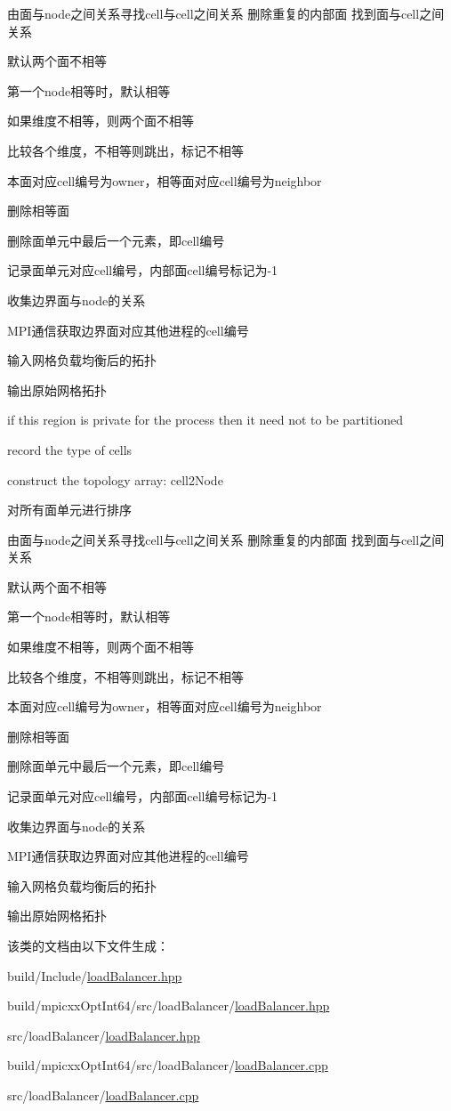 由面与node之间关系寻找cell与cell之间关系 删除重复的内部面 找到面与cell之间关系

默认两个面不相等

第一个node相等时，默认相等

如果维度不相等，则两个面不相等

比较各个维度，不相等则跳出，标记不相等

本面对应cell编号为owner，相等面对应cell编号为neighbor

删除相等面

删除面单元中最后一个元素，即cell编号

记录面单元对应cell编号，内部面cell编号标记为-\/1

收集边界面与node的关系

MPI通信获取边界面对应其他进程的cell编号

输入网格负载均衡后的拓扑

输出原始网格拓扑

if this region is private for the process then it need not to be partitioned

record the type of cells

construct the topology array: cell2Node

对所有面单元进行排序

由面与node之间关系寻找cell与cell之间关系 删除重复的内部面 找到面与cell之间关系

默认两个面不相等

第一个node相等时，默认相等

如果维度不相等，则两个面不相等

比较各个维度，不相等则跳出，标记不相等

本面对应cell编号为owner，相等面对应cell编号为neighbor

删除相等面

删除面单元中最后一个元素，即cell编号

记录面单元对应cell编号，内部面cell编号标记为-\/1

收集边界面与node的关系

MPI通信获取边界面对应其他进程的cell编号

输入网格负载均衡后的拓扑

输出原始网格拓扑 

该类的文档由以下文件生成：\begin{DoxyCompactItemize}
\item 
build/Include/\hyperlink{build_2Include_2loadBalancer_8hpp}{loadBalancer.hpp}\item 
build/mpicxxOptInt64/src/loadBalancer/\hyperlink{build_2mpicxxOptInt64_2src_2loadBalancer_2loadBalancer_8hpp}{loadBalancer.hpp}\item 
src/loadBalancer/\hyperlink{src_2loadBalancer_2loadBalancer_8hpp}{loadBalancer.hpp}\item 
build/mpicxxOptInt64/src/loadBalancer/\hyperlink{build_2mpicxxOptInt64_2src_2loadBalancer_2loadBalancer_8cpp}{loadBalancer.cpp}\item 
src/loadBalancer/\hyperlink{src_2loadBalancer_2loadBalancer_8cpp}{loadBalancer.cpp}\end{DoxyCompactItemize}
